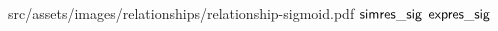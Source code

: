 
\relatplot
{src/assets/images/relationships/relationship-sigmoid.pdf}
{$\mathsf{simres\_sig}$}
{$\mathsf{expres\_sig}$}